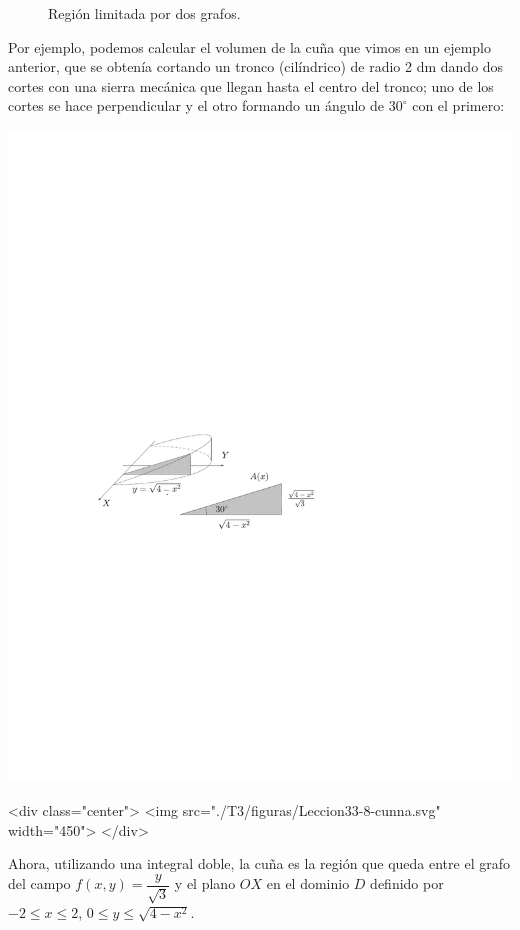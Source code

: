 \begin{ejemplo}
\begin{latexonly}
\begin{figure}
\begin{center}
\end{center}
\caption{Región limitada por dos grafos.}\label{fig:fub}
\end{figure}
\end{latexonly}
%
Por ejemplo, podemos calcular el volumen de la cuña que vimos en un ejemplo anterior, que se obtenía cortando un tronco (cilíndrico) de radio 2 dm dando dos cortes con una sierra mecánica que llegan hasta el centro del
tronco; uno de los cortes se hace perpendicular y el otro formando un ángulo de
$30^\circ$ con  el primero:
\begin{latexonly}
\begin{center}
\includegraphics{T3/figs/cunna.pdf}
\end{center}
\end{latexonly}
\begin{rawhtml}
<div class="center">
<img src="./T3/figuras/Leccion33-8-cunna.svg" width="450">
</div>
\end{rawhtml}
Ahora, utilizando una integral doble, la cuña es la región que queda entre el grafo del campo $f(x,y)=\dfrac{y}{\sqrt3}$ y el plano $OX$ en el dominio $\mathit D$ definido por $-2\le x\le 2$, $0\le y \le\sqrt{4-x^2}$.

\end{ejemplo}
